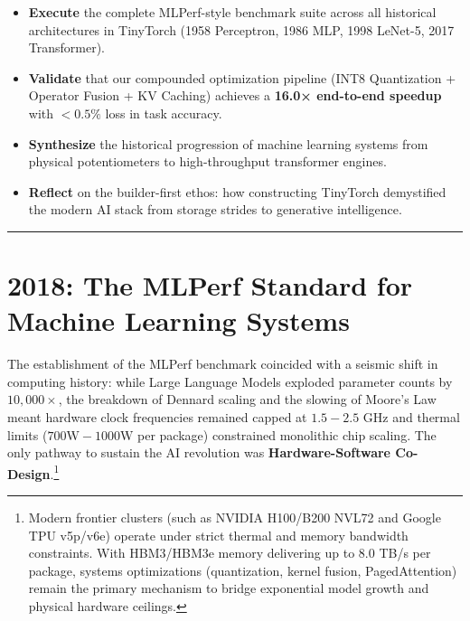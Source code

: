 \documentclass[
  letterpaper,
]{scrbook}
\providecommand{\tightlist}{%
  \setlength{\itemsep}{0pt}\setlength{\parskip}{0pt}}
\begin{document}

\begin{itemize}
\tightlist
\item
  \textbf{Execute} the complete MLPerf-style benchmark suite across all
  historical architectures in TinyTorch (1958 Perceptron, 1986 MLP, 1998
  LeNet-5, 2017 Transformer).
\item
  \textbf{Validate} that our compounded optimization pipeline (INT8
  Quantization + Operator Fusion + KV Caching) achieves a \textbf{16.0×
  end-to-end speedup} with \(<0.5\%\) loss in task accuracy.
\item
  \textbf{Synthesize} the historical progression of machine learning
  systems from physical potentiometers to high-throughput transformer
  engines.
\item
  \textbf{Reflect} on the builder-first ethos: how constructing
  TinyTorch demystified the modern AI stack from storage strides to
  generative intelligence.
\end{itemize}

\begin{center}\rule{0.5\linewidth}{0.5pt}\end{center}

\section*{2018: The MLPerf Standard for Machine Learning
Systems}\label{the-mlperf-standard-for-machine-learning-systems}


The establishment of the MLPerf benchmark coincided with a seismic shift
in computing history: while Large Language Models exploded parameter
counts by \(10{,}000\times\), the breakdown of Dennard scaling and the
slowing of Moore's Law meant hardware clock frequencies remained capped
at \(1.5-2.5\text{ GHz}\) and thermal limits
(\(700\text{W}-1000\text{W}\) per package) constrained monolithic chip
scaling. The only pathway to sustain the AI revolution was
\textbf{Hardware-Software Co-Design}.\footnote{Modern frontier clusters
  (such as NVIDIA H100/B200 NVL72 and Google TPU v5p/v6e) operate under
  strict thermal and memory bandwidth constraints. With HBM3/HBM3e
  memory delivering up to 8.0 TB/s per package, systems optimizations
  (quantization, kernel fusion, PagedAttention) remain the primary
  mechanism to bridge exponential model growth and physical hardware
  ceilings.}
\end{document}
